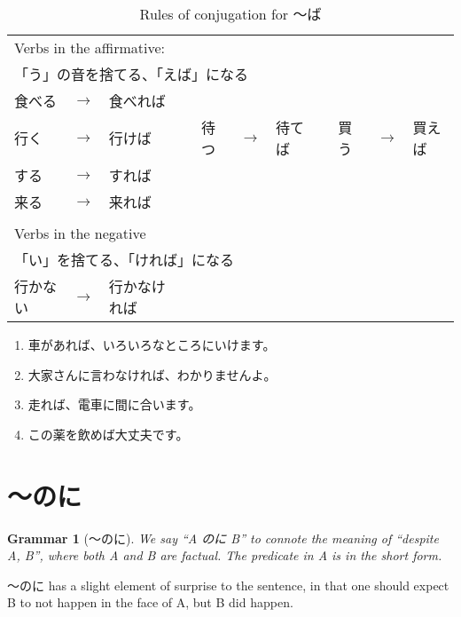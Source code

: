 \documentclass[notoc,notitlepage]{tufte-book}
\newtheorem{grammar}{\faBook Grammar}
\begin{document}
\begin{table*}[ht]
  \centering
  \caption{Rules of conjugation for 〜ば}
  \label{table:rules_of_conjugation_for_ba}
  \begin{tabular}{l c l c l c l c l c l}
  \multicolumn{11}{l}{Verbs in the affirmative:} \\
  \multicolumn{11}{l}{「う」の音を捨てる、「えば」になる} \\
  食べる & $\to$ & 食べれば \\
  行く   & $\to$ & 行けば &  & 待つ & $\to$ & 待てば &  & 買う & $\to$ & 買えば \\
  する   & $\to$ & すれば \\
  来る   & $\to$ & 来れば \\
  $  $ \\
  \multicolumn{11}{l}{Verbs in the negative} \\
  \multicolumn{11}{l}{「い」を捨てる、「ければ」になる} \\
  行かない & $\to$ & 行かなければ
  \end{tabular}
\end{table*}

\begin{eg}
  \begin{enumerate}
    \item 車があれば、いろいろなところにいけます。
    \item 大家さんに言わなければ、わかりませんよ。
    \item 走れば、電車に間に合います。
    \item この薬を飲めば大丈夫です。
  \end{enumerate}
\end{eg}


\section{〜のに}%
\label{sec:noni}

\begin{grammar}[〜のに]\label{grammar:_noni}
  We say ``A のに B'' to connote the meaning of ``despite A, B'',
  where both A and B are factual.
  The predicate in A is in the short form.
\end{grammar}

\begin{note}
  〜のに has a slight element of surprise to the sentence,
  in that one should expect B to not happen in the face of A,
  but B did happen.
\end{note}
\end{document}
